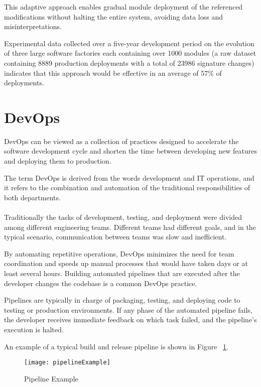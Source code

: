 This adaptive approach enables gradual module deployment of the referenced modifications without halting the entire system, avoiding data loss and misinterpretations.

Experimental data \cite{seco2020robust} collected over a five-year development period on the evolution of three large software factories each containing over 1000 modules
(a raw dataset containing 8889 production deployments with a total of 23986 signature changes)
indicates that this approach would be effective in an average of 57\% of deployments.

\section{DevOps} %
\label{sec:dev_ops}

DevOps can be viewed as a collection of practices designed to accelerate the software development cycle and shorten the time between developing new features and deploying them to production.

The term DevOps is derived from the words development and IT operations, and it refers to the combination and automation of the traditional responsibilities of both departments.

\paragraph{}

Traditionally the tasks of development, testing, and deployment were divided among different engineering teams.
Different teams had different goals, and in the typical scenario, communication between teams was slow and inefficient.

By automating repetitive operations, DevOps minimizes the need for team coordination and speeds up manual processes that would have taken days or at least several hours.
Building automated pipelines that are executed after the developer changes the codebase is a common DevOps practice.

Pipelines are typically in charge of packaging, testing, and deploying code to testing or production environments.
If any phase of the automated pipeline fails, the developer receives immediate feedback on which task failed, and the pipeline's execution is halted.

An example of a typical build and release pipeline is shown in Figure ~\ref{fig:pipeline_example}.

\begin{figure}[htbp]
    \centering
    \texttt{[image: pipelineExample]}
    \caption{Pipeline Example}
    \label{fig:pipeline_example}
\end{figure}
